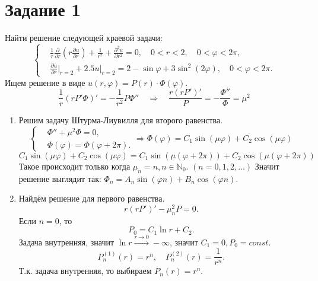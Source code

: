 \section*{Задание 1}
    Найти решение следующей краевой задачи: 
    \[
        \left\{\begin{split}
            & \frac{1}{r} \frac{\partial}{\partial r} \left( r \frac{\partial u}{\partial r} \right) + \frac{1}{r^2} + \frac{\partial^2 u}{\partial r^2} = 0, \quad 0 < r < 2, \quad 0 < \varphi < 2\pi, \\
            & \frac{\partial u}{\partial r} \big|_{r=2} + 2.5 u|_{r=2} = 2 - \sin \varphi + 3 \sin^2 (2\varphi), \quad 0 < \varphi < 2\pi.
        \end{split} \right.
    \]
    Ищем решение в виде \( u(r, \varphi) = P(r) \cdot \Phi(\varphi) \).
    \[
        \frac{1}{r} \left( r P' \Phi \right)' = - \frac{1}{r^2} P \Phi''
        \quad \Rightarrow \quad
        \frac{r\left(r P'\right)'}{P} = - \frac{\Phi''}{\Phi} = \mu^2
    \]
    \begin{enumerate}
        \item Решим задачу Штурма-Лиувилля для второго равенства.
        \[
            \left\{\begin{split}
                & \Phi'' + \mu^2 \Phi = 0, \\
                & \Phi(\varphi) = \Phi(\varphi + 2\pi).
            \end{split}\right.
            \Rightarrow
            \Phi(\varphi) = C_1 \sin (\mu \varphi) + C_2 \cos (\mu \varphi) 
        \]
        \[
            C_1 \sin (\mu \varphi) + C_2 \cos (\mu \varphi) = C_1 \sin \left(\mu (\varphi+2\pi)\right) + C_2 \cos \left(\mu (\varphi+2\pi)\right)
        \]
        Такое происходит только когда \( \mu_n = n, n \in \mathbb{N}_0 \). \( (n = 0,1,2,\dots) \) Значит решение выглядит так:
        \(
            \Phi_n = A_n \sin (\varphi n) + B_n \cos (\varphi n)
        \).
        \item Найдём решение для первого равенства.
        \[
            r\left( r P' \right)' - \mu_n^2 P = 0.
        \]
        Если \( n = 0 \), то 
        \[
            P_0 = C_1 \ln r + C_2.
        \]
        Задача внутренняя, значит \( \ln r \xrightarrow{r \to 0} -\infty \), значит \( C_1 = 0, P_0 = const \).
        \[
            P_n^{(1)}(r) = r^n, \quad P_n^{(2)}(r) = \frac{1}{r^n}.
        \]
        Т.к. задача внутренняя, то выбираем \( P_n(r) = r^n \).
    \end{enumerate}

